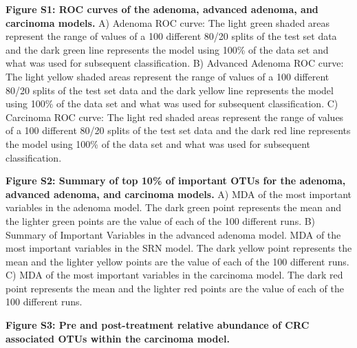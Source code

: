 \documentclass[12pt,]{article}
\begin{document}
\textbf{Figure S1: ROC curves of the adenoma, advanced adenoma, and
carcinoma models.} A) Adenoma ROC curve: The light green shaded areas
represent the range of values of a 100 different 80/20 splits of the
test set data and the dark green line represents the model using 100\%
of the data set and what was used for subsequent classification. B)
Advanced Adenoma ROC curve: The light yellow shaded areas represent the
range of values of a 100 different 80/20 splits of the test set data and
the dark yellow line represents the model using 100\% of the data set
and what was used for subsequent classification. C) Carcinoma ROC curve:
The light red shaded areas represent the range of values of a 100
different 80/20 splits of the test set data and the dark red line
represents the model using 100\% of the data set and what was used for
subsequent classification.

\textbf{Figure S2: Summary of top 10\% of important OTUs for the
adenoma, advanced adenoma, and carcinoma models.} A) MDA of the most
important variables in the adenoma model. The dark green point
represents the mean and the lighter green points are the value of each
of the 100 different runs. B) Summary of Important Variables in the
advanced adenoma model. MDA of the most important variables in the SRN
model. The dark yellow point represents the mean and the lighter yellow
points are the value of each of the 100 different runs. C) MDA of the
most important variables in the carcinoma model. The dark red point
represents the mean and the lighter red points are the value of each of
the 100 different runs.

\textbf{Figure S3: Pre and post-treatment relative abundance of CRC
associated OTUs within the carcinoma model.}

\newpage
\end{document}

